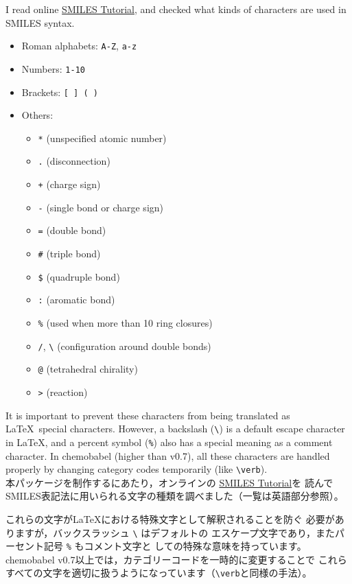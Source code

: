 \documentclass[12pt]{ltjsarticle}
\begin{document}
I read online
\href{http://www.daylight.com/meetings/summerschool98/course/dave/smiles-intro.html}{SMILES Tutorial},
and checked what kinds of characters are used in SMILES syntax.
\begin{itemize}
\item Roman alphabets: \verb|A-Z|, \verb|a-z|
\item Numbers: \verb|1-10|
\item Brackets: \verb|[ ] ( )|
\item Others:
\begin{itemize}
\item \verb|*| (unspecified atomic number)
\item \verb|.| (disconnection)
\item \verb|+| (charge sign)
\item \verb|-| (single bond or charge sign)
\item \verb|=| (double bond)
\item \verb|#| (triple bond)
\item \verb|$| (quadruple bond)
\item \verb|:| (aromatic bond)
\item \verb|%| (used when more than 10 ring closures)
\item \verb|/|, \verb|\| (configuration around double bonds)
\item \verb|@| (tetrahedral chirality)
\item \verb|>| (reaction)
\end{itemize}
\end{itemize}

It is important to prevent these characters from being translated as
\LaTeX\ special characters.
However, a backslash (\verb|\|) is a default escape character in \LaTeX,
and a percent symbol (\verb|%|) also has a special meaning as a comment character.
In \textsf{chemobabel} (higher than v0.7), all these characters are
handled properly by changing category codes temporarily (like \verb+\verb+). \\

本パッケージを制作するにあたり，オンラインの
\href{http://www.daylight.com/meetings/summerschool98/course/dave/smiles-intro.html}{SMILES Tutorial}を
読んでSMILES表記法に用いられる文字の種類を調べました（一覧は英語部分参照）。

これらの文字が\LaTeX における特殊文字として解釈されることを防ぐ
必要がありますが，バックスラッシュ \verb|\| はデフォルトの
エスケープ文字であり，またパーセント記号 \verb|%| もコメント文字と
しての特殊な意味を持っています。
\textsf{chemobabel} v0.7以上では，カテゴリーコードを一時的に変更することで
これらすべての文字を適切に扱うようになっています（\verb+\verb+と同様の手法）。
\end{document}
